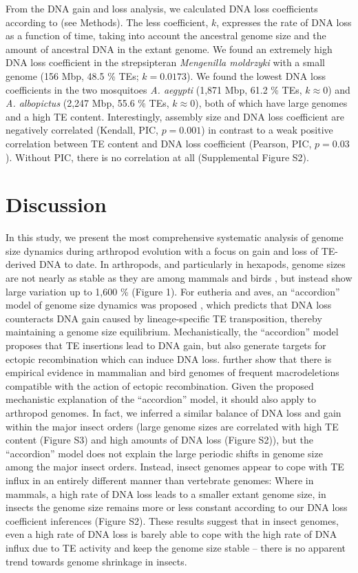 From the DNA gain and loss analysis, we calculated DNA loss coefficients
according to \citep{Kapusta2017a} (see Methods). The less coefficient,
\(k\), expresses the rate of DNA loss as a function of
time, taking into account the ancestral genome size and the amount of
ancestral DNA in the extant genome. We found an extremely high DNA loss
coefficient in the strepsipteran \emph{Mengenilla moldrzyki} with a
small genome (156 Mbp, 48.5 \% TEs; \(k = 0.0173\)). We found the
lowest DNA loss coefficients in the two mosquitoes \emph{A. aegypti}
(1,871 Mbp, 61.2 \% TEs, \(k \approx 0\)) and \emph{A. albopictus}
(2,247 Mbp, 55.6 \% TEs, \(k \approx 0\)), both of which have large
genomes and a high TE content. Interestingly, assembly size and DNA loss
coefficient are negatively correlated (Kendall, PIC, \(p = 0.001\))
in contrast to a weak positive correlation between TE content and DNA
loss coefficient (Pearson, PIC, \(p = 0.03\)). Without PIC, there
is no correlation at all (Supplemental Figure S2).



\section{Discussion}\label{discussion}

In this study, we present the most comprehensive systematic analysis of
genome size dynamics during arthropod evolution with a focus on gain and
loss of TE-derived DNA to date. In arthropods, and particularly in
hexapods, genome sizes are not nearly as stable as they are among
mammals and birds \citep{Kapusta2017a}, but instead show large variation
up to 1,600 \% (Figure 1). For eutheria and aves, an ``accordion'' model
of genome size dynamics was proposed \citep{Kapusta2017a}, which predicts
that DNA loss counteracts DNA gain caused by lineage-specific TE
transposition, thereby maintaining a genome size equilibrium.
Mechanistically, the ``accordion'' model proposes that TE insertions
lead to DNA gain, but also generate targets for ectopic recombination
which can induce DNA loss. \citet{Kapusta2017a} further show that there is
empirical evidence in mammalian and bird genomes of frequent
macrodeletions compatible with the action of ectopic recombination.
Given the proposed mechanistic explanation of the ``accordion'' model,
it should also apply to arthropod genomes. In fact, we inferred a
similar balance of DNA loss and gain within the major insect orders
(large genome sizes are correlated with high TE content (Figure S3) and
high amounts of DNA loss (Figure S2)), but the ``accordion'' model does
not explain the large periodic shifts in genome size among the major
insect orders. Instead, insect genomes appear to cope with TE influx in
an entirely different manner than vertebrate genomes: Where in mammals,
a high rate of DNA loss leads to a smaller extant genome size, in
insects the genome size remains more or less constant according to our
DNA loss coefficient inferences (Figure S2). These results suggest that
in insect genomes, even a high rate of DNA loss is barely able to cope
with the high rate of DNA influx due to TE activity and keep the genome
size stable -- there is no apparent trend towards genome shrinkage in
insects.

